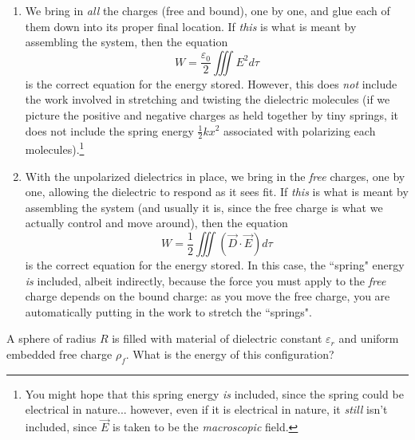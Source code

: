 \begin{enumerate}
    \item We bring in \textit{all} the charges (free and bound), one by one, and glue each of them down into its proper final location. If \textit{this} is what is meant by assembling the system, then the equation
    \[W=\frac{\varepsilon_0}{2}\iiint E^2d\tau\]
    is the correct equation for the energy stored. However, this does \textit{not} include the work involved in stretching and twisting the dielectric molecules (if we picture the positive and negative charges as held together by tiny springs, it does not include the spring energy $\frac{1}{2}kx^2$ associated with polarizing each molecules).\footnote{You might hope that this spring energy \textit{is} included, since the spring could be electrical in nature... however, even if it is electrical in nature, it \textit{still} isn't included, since $\vec{E}$ is taken to be the \textit{macroscopic} field.}
    \item With the unpolarized dielectrics in place, we bring in the \textit{free} charges, one by one, allowing the dielectric to respond as it sees fit. If \textit{this} is what is meant by assembling the system (and usually it is, since the free charge is what we actually control and move around), then the equation
    \[W=\frac{1}{2}\iiint (\vec{D}\cdot\vec{E})d\tau\]
    is the correct equation for the energy stored. In this case, the ``spring" energy \textit{is} included, albeit indirectly, because the force you must apply to the \textit{free} charge depends on the bound charge: as you move the free charge, you are automatically putting in the work to stretch the ``springs".
\end{enumerate}

\begin{example}
A sphere of radius $R$ is filled with material of dielectric constant $\varepsilon_r$ and uniform embedded free charge $\rho_f$. What is the energy of this configuration?
\end{example}

